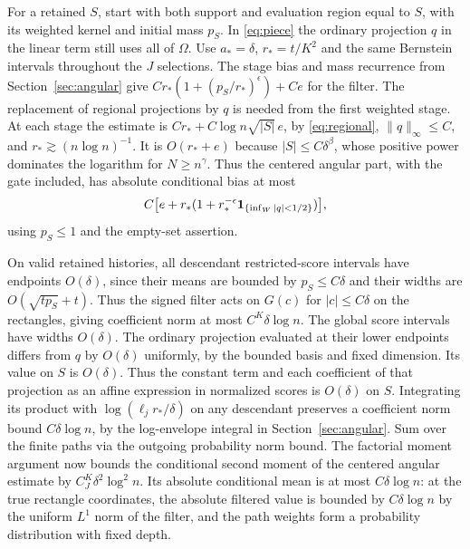 For a retained \(S\), start with both support and evaluation
region equal to \(S\), with its weighted kernel and initial
mass \(p_S\). In \eqref{eq:piece} the ordinary projection
\(q\) in the linear term still uses all of \(\Omega\).
Use \(a_*=\delta\), \(r_*=t/K^2\) and the same Bernstein
intervals throughout the \(J\) selections. The stage bias and mass
recurrence from Section~\ref{sec:angular} give
\(C r_*(1+(p_S/r_*)^\epsilon)+Ce\) for the filter.
The replacement of regional projections by \(q\) is needed
from the first weighted stage. At each stage the estimate is
\(C r_*+C\log n\sqrt{|S|}\,e\), by \eqref{eq:regional},
\(\|q\|_\infty\le C\), and \(r_*\gtrsim (n\log n)^{-1}\).
It is \(O(r_*+e)\) because \(|S|\le C\delta^\beta\),
whose positive power dominates the logarithm for
\(N\ge n^\gamma\). Thus the centered angular part, with the
gate included, has absolute conditional bias at most
\begin{equation}\label{eq:high-bias}
 C\bigl[e+r_*(1+r_*^{-\epsilon}
                        \mathbf 1_{\{\inf_W|q|<1/2\}})\bigr],
\end{equation}
using \(p_S\le1\) and the empty-set assertion.

On valid retained histories, all descendant restricted-score
intervals have endpoints \(O(\delta)\), since their means
are bounded by \(p_S\le C\delta\) and their widths are
\(O(\sqrt{t p_S}+t)\). Thus the signed filter acts on
\(G(c)\) for \(|c|\le C\delta\) on the rectangles, giving
coefficient norm at most \(C^K\delta\log n\).
The global score intervals have widths \(O(\delta)\).
The ordinary projection evaluated at their lower endpoints
differs from \(q\) by \(O(\delta)\) uniformly, by the bounded
basis and fixed dimension. Its value on \(S\) is \(O(\delta)\).
Thus the constant term and each coefficient of that
projection as an affine expression in normalized scores is
\(O(\delta)\) on \(S\). Integrating its product with
\(\log(\ell_j r_*/\delta)\) on any descendant preserves a
coefficient norm bound \(C\delta\log n\), by the log-envelope
integral in Section~\ref{sec:angular}. Sum over the finite
paths via the outgoing probability norm bound. The factorial
moment argument now bounds the conditional second moment of
the centered angular estimate by \(C_J^K\delta^2\log^2 n\).
Its absolute conditional mean is at most \(C\delta\log n\):
at the true rectangle coordinates, the absolute filtered
value is bounded by \(C\delta\log n\) by the uniform
\(L^1\) norm of the filter, and the path weights form a
probability distribution with fixed depth.

